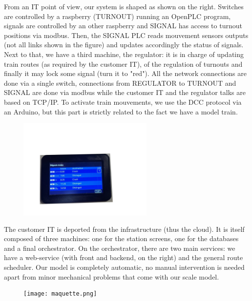 \documentclass[runningheads]{llncs}
\begin{document}
From an IT point of view, our system is shaped as shown on the right. Switches are controlled by a raspberry (TURNOUT) running an OpenPLC program, signals are controlled by an other raspberry and SIGNAL has access to turnout positions via modbus. Then, the SIGNAL PLC reads mouvement sensors outputs (not all links shown in the figure) and updates accordingly the status of signals. Next to that, we have a third machine, the regulator: it is in charge of updating train routes (as required by the customer IT),  of the regulation of turnouts and finally it may lock some signal (turn it to "red"). All the network connections are done via a single switch, connections from REGULATOR to TURNOUT and SIGNAL are done via modbus while the customer IT and the regulator talks  are based on TCP/IP.  To activate train mouvements, we use the DCC protocol via an Arduino, but this part is strictly related to the fact we have a model train. 


\begin{figure}
\hspace{-10mm}
 \begin{minipage}{0.3\textwidth}
        \centering
        \vspace{-24mm}
\includegraphics[height=50mm]{ZoomAffichage.png}
    \end{minipage}
\end{figure}

 The customer IT is deported from the infrastructure (thus the cloud).  It is itself composed of three machines: one for the station screens, one for the databases and a final orchestrator. On the orchestrator, there are two main services: we have a web-service (with front and backend, on the right) and the general route scheduler.  Our model is completely automatic, no manual intervention is needed apart from minor mechanical problems that come with our scale model.
 
\begin{figure}
 \begin{minipage}{0.28\textwidth}
        \centering
        \vspace{-10mm}
\texttt{[image: maquette.png]}
    \end{minipage}
\end{figure}
\end{document}
